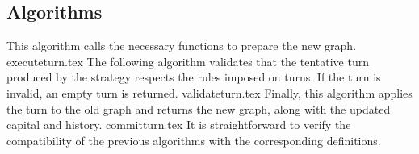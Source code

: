   \subsection{Algorithms}
    This algorithm calls the necessary functions to prepare the new graph.
    {executeturn.tex}
    The following algorithm validates that the tentative turn produced by the strategy respects the rules imposed on turns.
    If the turn is invalid, an empty turn is returned.
    {validateturn.tex}
    Finally, this algorithm applies the turn to the old graph and returns the new graph, along with the updated capital and
    history.
    {committurn.tex}
    It is straightforward to verify the compatibility of the previous algorithms with the corresponding definitions.

